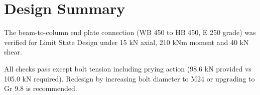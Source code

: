 \documentclass[12pt]{article}
\begin{document}
\FloatBarrier

\section{Design Summary}

The beam-to-column end plate connection (WB 450 to HB 450, E 250 grade) was verified for Limit State Design under 15 kN axial, 210 kNm moment and 40 kN shear.

All checks pass except bolt tension including prying action (98.6 kN provided vs 105.0 kN required). Redesign by increasing bolt diameter to M24 or upgrading to Gr 9.8 is recommended.

\FloatBarrier
\end{document}
